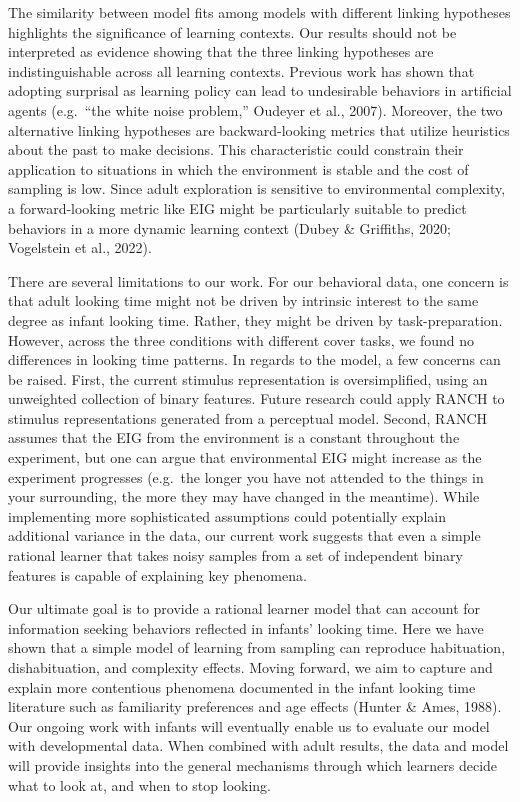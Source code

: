 \documentclass[10pt, letterpaper]{article}
\begin{document}
The similarity between model fits among models with different linking
hypotheses highlights the significance of learning contexts. Our results
should not be interpreted as evidence showing that the three linking
hypotheses are indistinguishable across all learning contexts. Previous
work has shown that adopting surprisal as learning policy can lead to
undesirable behaviors in artificial agents (e.g.~``the white noise
problem,'' Oudeyer et al., 2007). Moreover, the two alternative linking
hypotheses are backward-looking metrics that utilize heuristics about
the past to make decisions. This characteristic could constrain their
application to situations in which the environment is stable and the
cost of sampling is low. Since adult exploration is sensitive to
environmental complexity, a forward-looking metric like EIG might be
particularly suitable to predict behaviors in a more dynamic learning
context (Dubey \& Griffiths, 2020; Vogelstein et al., 2022).

There are several limitations to our work. For our behavioral data, one
concern is that adult looking time might not be driven by intrinsic
interest to the same degree as infant looking time. Rather, they might
be driven by task-preparation. However, across the three conditions with
different cover tasks, we found no differences in looking time patterns.
In regards to the model, a few concerns can be raised. First, the
current stimulus representation is oversimplified, using an unweighted
collection of binary features. Future research could apply RANCH to
stimulus representations generated from a perceptual model. Second,
RANCH assumes that the EIG from the environment is a constant throughout
the experiment, but one can argue that environmental EIG might increase
as the experiment progresses (e.g.~the longer you have not attended to
the things in your surrounding, the more they may have changed in the
meantime). While implementing more sophisticated assumptions could
potentially explain additional variance in the data, our current work
suggests that even a simple rational learner that takes noisy samples
from a set of independent binary features is capable of explaining key
phenomena.

Our ultimate goal is to provide a rational learner model that can
account for information seeking behaviors reflected in infants' looking
time. Here we have shown that a simple model of learning from sampling
can reproduce habituation, dishabituation, and complexity effects.
Moving forward, we aim to capture and explain more contentious phenomena
documented in the infant looking time literature such as familiarity
preferences and age effects (Hunter \& Ames, 1988). Our ongoing work
with infants will eventually enable us to evaluate our model with
developmental data. When combined with adult results, the data and model
will provide insights into the general mechanisms through which learners
decide what to look at, and when to stop looking.
\end{document}
